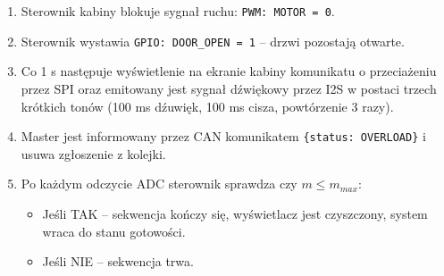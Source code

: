\documentclass[12pt,a4paper]{article}
\begin{document}
\begin{enumerate}
    \item Sterownik kabiny blokuje sygna\l{} ruchu: \texttt{PWM: MOTOR = 0}.
    \item Sterownik wystawia \texttt{GPIO: DOOR\_OPEN = 1} -- drzwi pozostaj\k{a} otwarte.
    \item Co 1 s nast\k{e}puje wy\'swietlenie na ekranie kabiny komunikatu o przecia\. zeniu przez SPI oraz emitowany jest sygna\l{} d\'zwi\k{e}kowy przez I2S w postaci trzech kr\'otkich ton\'ow (100 ms d\'zuwi\k{e}k, 100 ms cisza, powt\'orzenie 3 razy).
    \item Master jest informowany przez CAN komunikatem \texttt{\{status: OVERLOAD\}} i usuwa zg\l oszenie z kolejki.
    \item Po ka\. zdym odczycie ADC sterownik sprawdza czy $m \leq m_{max}$:
    \begin{itemize}
        \item Je\'sli TAK -- sekwencja ko\'nczy si\k{e}, wy\'swietlacz jest czyszczony, system wraca do stanu gotowo\'sci.
        \item Je\'sli NIE -- sekwencja trwa.
    \end{itemize}
\end{enumerate}
\end{document}
